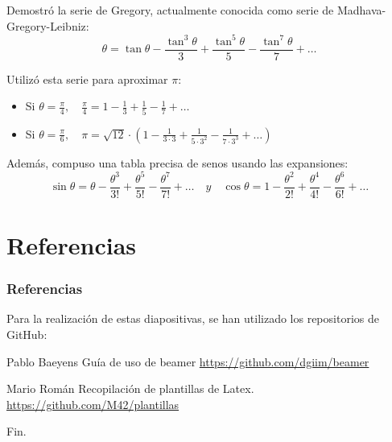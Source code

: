 \documentclass[compress, aspectratio=169]{beamer} %
\begin{document}
		\begin{frame}
			Demostró la serie de Gregory, actualmente conocida como serie de Madhava-Gregory-Leibniz:
			$$\theta = \tan \theta - \frac{\tan^3 \theta}{3} + \frac{\tan^5 \theta}{5} - \frac{\tan^7 \theta}{7} + \dots$$

			Utilizó esta serie para aproximar $\pi$:
			\begin{itemize}
				\item Si $\displaystyle \theta = \frac{\pi}{4}, \quad \frac{\pi}{4} = 1 - \frac{1}{3} + \frac{1}{5}
				- \frac{1}{7} + \dots$
				\item Si $\displaystyle \theta = \frac{\pi}{6}, \quad \pi = \sqrt{12} \cdot \left(1 - \frac{1}{3 \cdot 3}
				+ \frac{1}{5 \cdot 3^2} - \frac{1}{7 \cdot 3^3} + \dots \right)$
			\end{itemize}
			
			Además, compuso una tabla precisa de senos usando las expansiones:
			$$\sin \theta = \theta - \frac{\theta^3}{3!} + \frac{\theta^5}{5!} - \frac{\theta^7}{7!} + \dots \quad y
			\quad \cos \theta = 1 - \frac{\theta^2}{2!} + \frac{\theta^4}{4!} - \frac{\theta^6}{6!} + \dots $$
		\end{frame}

\section{Referencias}
	\begin{frame}
		\frametitle{Referencias}
		
		Para la realización de estas diapositivas, se han utilizado los repositorios de GitHub:
		
		\footnotesize{
		  \begin{thebibliography}{7} %
		     Pablo Baeyens
		      \newblock Guía de uso de beamer
		      \newblock \url{https://github.com/dgiim/beamer}
		      
		     Mario Román
		      \newblock Recopilación de plantillas de Latex.
		      \newblock \url{https://github.com/M42/plantillas}
		  \end{thebibliography}
		}
	\end{frame}


\begin{frame}
\Huge{\centerline{Fin.}}
\end{frame}

\end{document}
